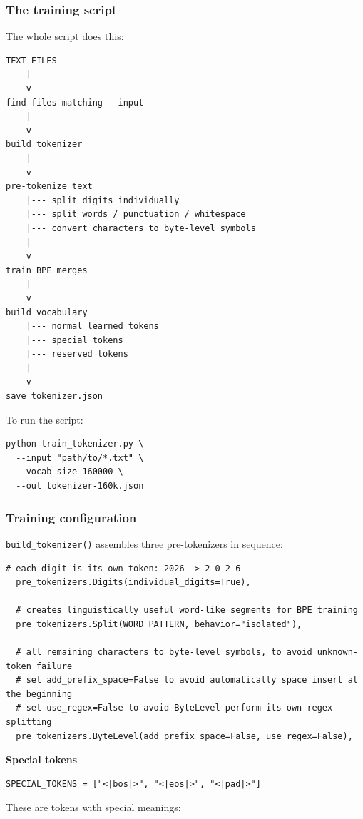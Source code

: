 \subsubsection*{The training script}

The whole script does this:
\begin{lstlisting}[style=shadedpython,language={},basicstyle=\footnotesize\ttfamily]
TEXT FILES
    |
    v
find files matching --input
    |
    v
build tokenizer
    |
    v
pre-tokenize text
    |--- split digits individually
    |--- split words / punctuation / whitespace
    |--- convert characters to byte-level symbols
    |
    v
train BPE merges
    |
    v
build vocabulary
    |--- normal learned tokens
    |--- special tokens
    |--- reserved tokens
    |
    v
save tokenizer.json
\end{lstlisting}

To run the script:
\begin{lstlisting}[style=shadedpython,breaklines=true]
python train_tokenizer.py \
  --input "path/to/*.txt" \
  --vocab-size 160000 \
  --out tokenizer-160k.json
\end{lstlisting}

\subsubsection*{Training configuration}

\texttt{build\_tokenizer()} assembles three pre-tokenizers in sequence:

\begin{lstlisting}[style=shadedpython,breaklines=true]
  # each digit is its own token: 2026 -> 2 0 2 6
  pre_tokenizers.Digits(individual_digits=True),

  # creates linguistically useful word-like segments for BPE training
  pre_tokenizers.Split(WORD_PATTERN, behavior="isolated"),

  # all remaining characters to byte-level symbols, to avoid unknown-token failure
  # set add_prefix_space=False to avoid automatically space insert at the beginning
  # set use_regex=False to avoid ByteLevel perform its own regex splitting
  pre_tokenizers.ByteLevel(add_prefix_space=False, use_regex=False),
\end{lstlisting}

\noindent\textbf{Special tokens}
\begin{lstlisting}[style=shadedpython,breaklines=true]
SPECIAL_TOKENS = ["<|bos|>", "<|eos|>", "<|pad|>"]
\end{lstlisting}
These are tokens with special meanings:

